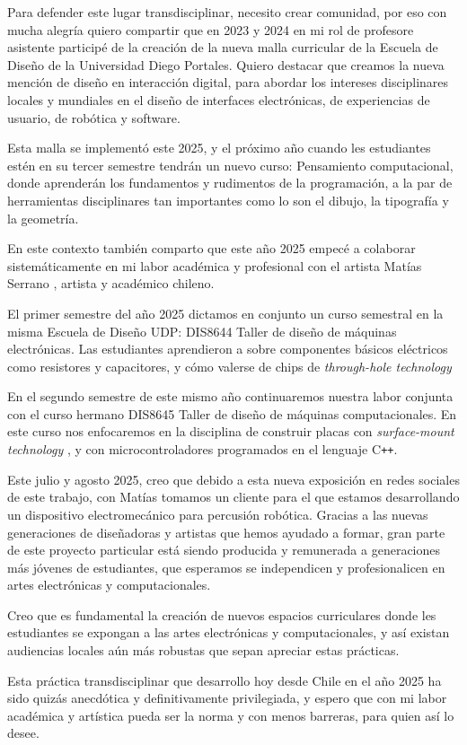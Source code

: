 \documentclass{article}
\begin{document}
Para defender este lugar transdisciplinar, necesito crear comunidad, por eso con mucha alegría quiero compartir que en 2023 y 2024 en mi rol de profesore asistente participé de la creación de la nueva malla curricular de la Escuela de Diseño de la Universidad Diego Portales. Quiero destacar que creamos la nueva mención de diseño en interacción digital, para abordar los intereses disciplinares locales y mundiales en el diseño de interfaces electrónicas, de experiencias de usuario, de robótica y software.

Esta malla se implementó este 2025, y el próximo año cuando les estudiantes estén en su tercer semestre tendrán un nuevo curso: Pensamiento computacional, donde aprenderán los fundamentos y rudimentos de la programación, a la par de herramientas disciplinares tan importantes como lo son el dibujo, la tipografía y la geometría.

En este contexto también comparto que este año 2025 empecé a colaborar sistemáticamente en mi labor académica y profesional con el artista Matías Serrano \cite{misaa}, artista y académico chileno.

El primer semestre del año 2025 dictamos en conjunto un curso semestral en la misma Escuela de Diseño UDP: DIS8644 Taller de diseño de máquinas electrónicas. Las estudiantes aprendieron a sobre componentes básicos eléctricos como resistores y capacitores, y cómo valerse de chips de \textit{through-hole technology} \cite{tht}

En el segundo semestre de este mismo año continuaremos nuestra labor conjunta con el curso hermano DIS8645 Taller de diseño de máquinas computacionales. En este curso nos enfocaremos en la disciplina de construir placas con \textit{surface-mount technology} \cite{smt}, y con microcontroladores programados en el lenguaje C\texttt{++}.

Este julio y agosto 2025, creo que debido a esta nueva exposición en redes sociales de este trabajo, con Matías tomamos un cliente para el que estamos desarrollando un dispositivo electromecánico para percusión robótica. Gracias a las nuevas generaciones de diseñadoras y artistas que hemos ayudado a formar, gran parte de este proyecto particular está siendo producida y remunerada a generaciones más jóvenes de estudiantes, que esperamos se independicen y profesionalicen en artes electrónicas y computacionales.

Creo que es fundamental la creación de nuevos espacios curriculares donde les estudiantes se expongan a las artes electrónicas y computacionales, y así existan audiencias locales aún más robustas que sepan apreciar estas prácticas.

Esta práctica transdisciplinar que desarrollo hoy desde Chile en el año 2025 ha sido quizás anecdótica y definitivamente privilegiada, y espero que con mi labor académica y artística pueda ser la norma y con menos barreras, para quien así lo desee.

\clearpage

\printbibliography[title={Bibliografía}, heading=bibintoc]
\end{document}

